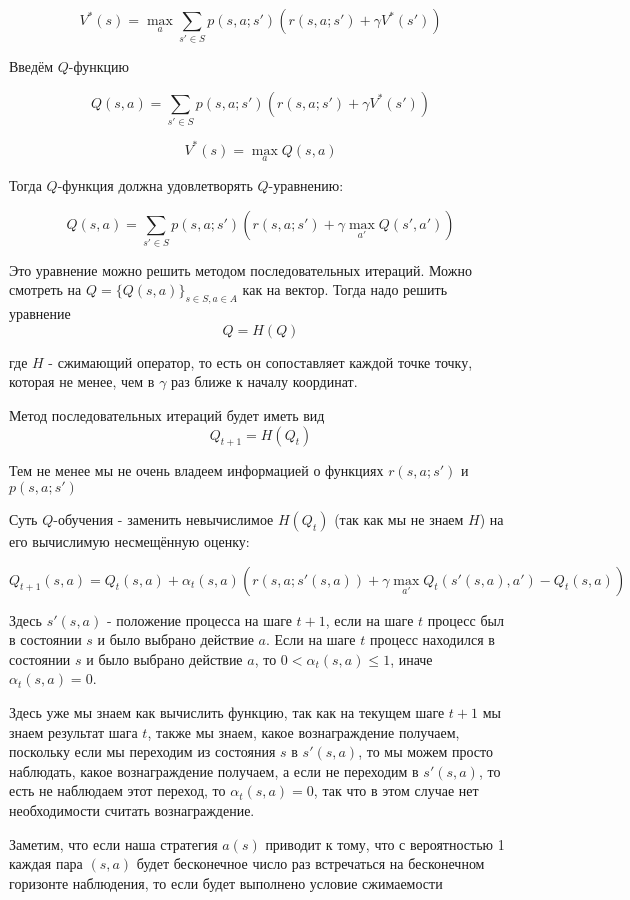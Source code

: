 \documentclass[a4paper]{article}
\begin{document}
\[ V^*(s) =  \max_{a} \sum_{s' \in S} p(s,a;s')\left( r(s,a;s') + \gamma V^*(s') \right) \]

Введём $Q$-функцию

\[ Q(s,a) = \sum_{s' \in S} p(s,a;s') \left(r(s,a;s') + \gamma V^*(s') \right) \]

\[ V^*(s) =  \max_{a} Q(s,a) \]

Тогда $Q$-функция должна удовлетворять $Q$-уравнению:

\[Q(s,a) = \sum_{s' \in S} p(s,a;s') \left( r(s,a;s') + \gamma \max_{a'} Q(s', a') \right) \]

Это уравнение можно решить методом последовательных итераций. Можно смотреть на $Q = \{ Q(s,a) \}_{s \in S, a \in A}$ как на вектор. Тогда надо решить уравнение 
\[ Q = H(Q) \]

где $H$ - сжимающий оператор, то есть он сопоставляет каждой точке точку, которая не менее, чем в $\gamma$ раз ближе к началу координат.

Метод последовательных итераций будет иметь вид \[Q_{t+1} = H(Q_t)\]

Тем не менее мы не очень владеем информацией о функциях $r(s,a;s')$ и $p(s,a;s')$

Суть $Q$-обучения - заменить невычислимое $H(Q_t)$ (так как мы не знаем $H$) на его вычислимую несмещённую оценку:

\[ Q_{t+1}(s,a) = Q_t(s,a) + \alpha_t(s,a) \left( r(s,a;s'(s,a)) + \gamma \max_{a'} Q_t(s'(s,a), a') - Q_t(s,a) \right) \] 

Здесь $s'(s,a)$ - положение процесса на шаге $t+1$, если на шаге $t$ процесс был в состоянии $s$ и было выбрано действие $a$. Если на шаге $t$ процесс находился в состоянии $s$ и было выбрано действие $a$, то $0 < \alpha_t(s,a) \leq 1$, иначе $\alpha_t(s,a) = 0$.

Здесь уже мы знаем как вычислить функцию, так как на текущем шаге $t+1$ мы знаем результат шага $t$, также мы знаем, какое вознаграждение получаем, поскольку если мы переходим из состояния $s$ в $s'(s,a)$, то мы можем просто наблюдать, какое вознаграждение получаем, а если не переходим в $s'(s,a)$, то есть не наблюдаем этот переход, то $\alpha_t(s,a) = 0$, так что в этом случае нет необходимости считать вознаграждение.

Заметим, что если наша стратегия $a(s)$ приводит к тому, что с вероятностью 1 каждая пара $(s, a)$ будет бесконечное число раз встречаться на бесконечном горизонте наблюдения, то если будет выполнено условие сжимаемости 
\end{document}
